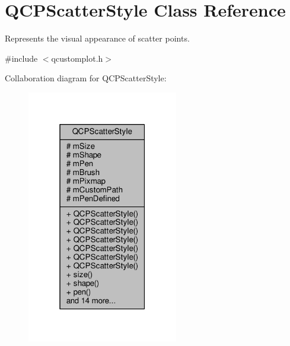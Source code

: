 \hypertarget{class_q_c_p_scatter_style}{}\section{Q\+C\+P\+Scatter\+Style Class Reference}
\label{class_q_c_p_scatter_style}


Represents the visual appearance of scatter points.  




{\ttfamily \#include $<$qcustomplot.\+h$>$}



Collaboration diagram for Q\+C\+P\+Scatter\+Style\+:\nopagebreak
\begin{figure}[H]
\begin{center}
\leavevmode
\includegraphics[width=187pt]{class_q_c_p_scatter_style__coll__graph}
\end{center}
\end{figure}
